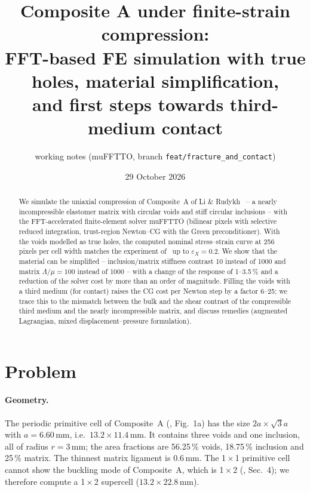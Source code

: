 \documentclass[11pt,a4paper]{article}
\title{Composite A under finite-strain compression:\\
FFT-based FE simulation with true holes, material simplification,\\ and first steps towards third-medium contact}
\author{working notes (muFFTTO, branch \texttt{feat/fracture\_and\_contact})}
\date{29 October 2026}
\begin{document}
\maketitle

\begin{abstract}
We simulate the uniaxial compression of Composite~A of Li \& Rudykh~\cite{LiRudykh2019} -- a nearly incompressible
elastomer matrix with circular voids and stiff circular inclusions -- with the FFT-accelerated finite-element solver
muFFTTO (bilinear pixels with selective reduced integration, trust-region Newton--CG with the Green preconditioner).
With the voids modelled as true holes, the computed nominal stress--strain curve at 256 pixels per cell width matches
the experiment of~\cite{LiRudykh2019} up to $\varepsilon_X = 0.2$. We show that the material can be simplified --
inclusion/matrix stiffness contrast 10 instead of 1000 and matrix $\Lambda/\mu = 100$ instead of 1000 -- with a
change of the response of 1--3.5\,\% and a reduction of the solver cost by more than an order of magnitude. Filling
the voids with a third medium (for contact) raises the CG cost per Newton step by a factor 6--25; we trace this to the
mismatch between the bulk and the shear contrast of the compressible third medium and the nearly incompressible
matrix, and discuss remedies (augmented Lagrangian, mixed displacement--pressure formulation).
\end{abstract}

\tableofcontents

\section{Problem}

\paragraph{Geometry.} The periodic primitive cell of Composite~A (\cite{LiRudykh2019}, Fig.~1a) has the size
$2a \times \sqrt{3}a$ with $a = 6.60$\,mm, i.e.\ $13.2 \times 11.4$\,mm. It contains three voids and one inclusion,
all of radius $r = 3$\,mm; the area fractions are 56.25\,\% voids, 18.75\,\% inclusion and 25\,\% matrix. The thinnest
matrix ligament is $0.6$\,mm. The 1\,$\times$\,1 primitive cell cannot show the buckling mode of Composite~A, which is
1\,$\times$\,2 (\cite{LiRudykh2019}, Sec.~4); we therefore compute a 1\,$\times$\,2 supercell
($13.2 \times 22.8$\,mm).
\end{document}
